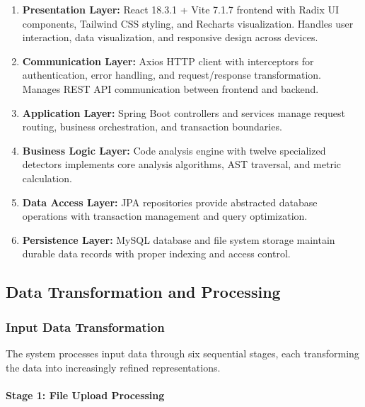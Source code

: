 \documentclass[12pt,a4paper]{article}
\begin{document}
    \begin{enumerate}[leftmargin=0.7in]
        \item \textbf{Presentation Layer:} React 18.3.1 + Vite 7.1.7 frontend with Radix UI components, Tailwind CSS styling, and Recharts visualization. Handles user interaction, data visualization, and responsive design across devices.

        \item \textbf{Communication Layer:} Axios HTTP client with interceptors for authentication, error handling, and request/response transformation. Manages REST API communication between frontend and backend.

        \item \textbf{Application Layer:} Spring Boot controllers and services manage request routing, business orchestration, and transaction boundaries.

        \item \textbf{Business Logic Layer:} Code analysis engine with twelve specialized detectors implements core analysis algorithms, AST traversal, and metric calculation.

        \item \textbf{Data Access Layer:} JPA repositories provide abstracted database operations with transaction management and query optimization.

        \item \textbf{Persistence Layer:} MySQL database and file system storage maintain durable data records with proper indexing and access control.
    \end{enumerate}

    \subsection{Data Transformation and Processing}

    \subsubsection{Input Data Transformation}

    The system processes input data through six sequential stages, each transforming the data into increasingly refined representations.

    \paragraph{Stage 1: File Upload Processing}
\end{document}
